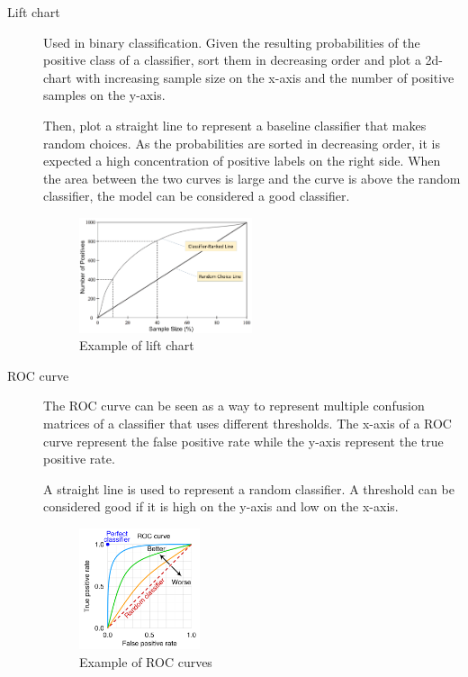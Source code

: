 \begin{description}
    \item[Lift chart] 
        Used in binary classification.
        Given the resulting probabilities of the positive class of a classifier, 
        sort them in decreasing order and plot a 2d-chart with
        increasing sample size on the x-axis and the number of positive samples on the y-axis.

        Then, plot a straight line to represent a baseline classifier that makes random choices.
        As the probabilities are sorted in decreasing order, it is expected a high concentration of
        positive labels on the right side.
        When the area between the two curves is large and the curve is above the random classifier, 
        the model can be considered a good classifier.

        \begin{figure}[h]
            \centering
            \includegraphics[width=0.5\textwidth]{img/lift_chart.png}
            \caption{Example of lift chart}
        \end{figure}

    \item[ROC curve] 
        The ROC curve can be seen as a way to represent multiple confusion matrices of a classifier
        that uses different thresholds.
        The x-axis of a ROC curve represent the false positive rate while the y-axis represent the true positive rate.

        A straight line is used to represent a random classifier.
        A threshold can be considered good if it is high on the y-axis and low on the x-axis.
        
        \begin{figure}[h]
            \centering
            \includegraphics[width=0.35\textwidth]{img/roc_curve.png}
            \caption{Example of ROC curves}
        \end{figure}
\end{description}


